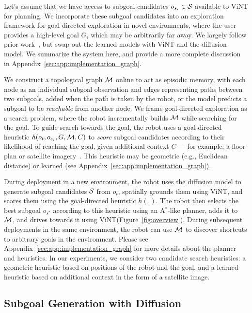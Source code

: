 \documentclass{article}
\newcommand{\ModelName}{ViNT\xspace}
\newcommand{\Astar}[0]{A$^*$\xspace}
\begin{document}
Let's assume that we have access to subgoal candidates $o_{s_i} \in {\mathcal{S}}$
available to \ModelName for planning. We incorporate these subgoal candidates into an exploration framework for goal-directed exploration in novel environments, where the user provides a high-level goal $G$, which may be arbitrarily far away.
We largely follow prior work~\cite{shah2022viking}, but swap out the learned models with \ModelName and the diffusion model. We summarize the system here, and provide a more complete discussion in Appendix~\ref{sec:app:implementation_graph}.

We construct a topological graph ${\mathcal{M}}$ online to act as episodic memory, with each node as an individual subgoal observation and edges representing paths between two subgoals, added when the path is taken by the robot, or the model predicts a subgoal to be \emph{reachable} from another node.
We frame goal-directed exploration as a search problem, where the robot incrementally builds ${\mathcal{M}}$ while searching for the goal. To guide search towards the goal, the robot uses a goal-directed heuristic $h(o_t, o_{s_i}, G, {\mathcal{M}}, C)$ to \emph{score} subgoal candidates according to their likelihood of reaching the goal, given additional context $C$ --- for example, a floor plan or satellite imagery~\cite{shah2022viking, truong2023i2o}. This heuristic may be geometric (e.g., Euclidean distance) or learned (see Appendix~\ref{sec:app:implementation_graph}).

During deployment in a new environment, the robot uses the diffusion model to generate subgoal candidates ${\mathcal{S}}$ from $o_t$, spatially grounds them using \ModelName,
and scores them using the goal-directed heuristic $h(.)$. The robot then selects the best subgoal $o_{s^*}$ according to this heuristic using an \Astar-like planner, adds it to ${\mathcal{M}}$, and drives towards it using \ModelName (Figure~\ref{fig:overview}). During subsequent deployments in the same environment, the robot can use ${\mathcal{M}}$ to discover shortcuts to arbitrary goals in the environment.
Please see Appendix~\ref{sec:app:implementation_graph} for more details about the planner and heuristics. In our experiments, we consider two candidate search heuristics: a geometric heuristic based on positions of the robot and the goal, and a learned heuristic based on additional context in the form of a satellite image.

\subsection{Subgoal Generation with Diffusion}
\label{sec:method_diffusion}
\end{document}
